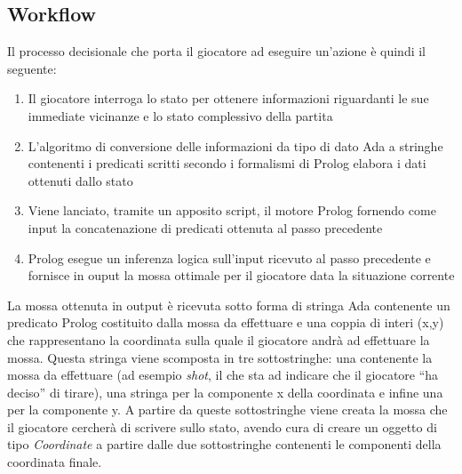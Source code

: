 \subsection{Workflow}
Il processo decisionale che porta il giocatore ad eseguire un'azione \`{e} quindi il seguente:
\begin{enumerate}
 \item Il giocatore interroga lo stato per ottenere informazioni riguardanti le sue immediate vicinanze e lo stato complessivo della partita
 \item L'algoritmo di conversione delle informazioni da tipo di dato Ada a stringhe contenenti i predicati scritti secondo i formalismi di Prolog elabora i dati ottenuti dallo stato
 \item Viene lanciato, tramite un apposito script, il motore Prolog fornendo come input la concatenazione di predicati ottenuta al passo precedente
 \item Prolog esegue un inferenza logica sull'input ricevuto al passo precedente e fornisce in ouput la mossa ottimale per il giocatore data la situazione corrente
 \end{enumerate} 
\noindent La mossa ottenuta in output \`{e} ricevuta sotto forma di stringa Ada contenente un predicato Prolog costituito dalla mossa da effettuare e una coppia di interi (x,y) che rappresentano la coordinata sulla quale il giocatore andr\`{a} ad effettuare la mossa. Questa stringa viene scomposta in tre sottostringhe: una contenente la mossa da effettuare (ad esempio \emph{shot}, il che sta ad indicare che il giocatore ``ha deciso'' di tirare), una stringa per la componente x della coordinata e infine una per la componente y. A partire da queste sottostringhe viene creata la mossa che il giocatore cercher\`{a} di scrivere sullo stato, avendo cura di creare un oggetto di tipo \emph{Coordinate} a partire dalle due sottostringhe contenenti le componenti della coordinata finale.